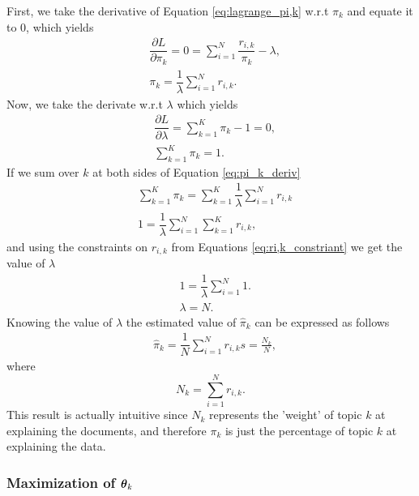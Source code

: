 \documentclass[12pt]{article}
\begin{document}
\noindent  First, we take the derivative of Equation \ref{eq:lagrange_pi,k} w.r.t $\pi_{k}$ and equate it to 0, which yields
\begin{align}\label{deriv_pi,k}
& \dfrac{\partial L}{\partial \pi_{k}} = 0 = \sum \limits_{i=1}^{N} \dfrac{r_{i,k}}{\pi_{k}} - \lambda, \\
& \pi_{k} = \dfrac{1}{\lambda} \sum \limits_{i=1}^{N} r_{i,k} \label{eq:pi_k_deriv}.
\end{align}
Now, we take the derivate w.r.t $\lambda$ which yields
\begin{align}
& \dfrac{\partial L}{\partial \lambda} = \sum \limits_{k=1}^{K} \pi_{k} - 1  = 0 ,\\
& \sum \limits_{k=1}^{K} \pi_{k} = 1.
\end{align}
If we sum over $k$ at both sides of Equation \ref{eq:pi_k_deriv}
\begin{align}
& \sum \limits_{k=1}^{K}\pi_{k} = \sum \limits_{k=1}^{K} \dfrac{1}{\lambda} \sum \limits_{i=1}^{N} r_{i,k}\\
& 1 = \dfrac{1}{\lambda} \sum \limits_{i=1}^{N}\sum \limits_{k=1}^{K}r_{i,k},
\end{align}
and using the constraints on $r_{i,k}$ from Equations \ref{eq:ri,k_constriant} we get the value of $\lambda$
\begin{align}
& 1 = \dfrac{1}{\lambda} \sum \limits_{i=1}^{N}1.\\
& \lambda = N.
\end{align}
Knowing the value of $\lambda$ the estimated value of $\hat{\pi}_{k}$ can be expressed as follows
\begin{align}\label{eq:pi_k}
& \hat{\pi}_{k} = \dfrac{1}{N} \sum \limits_{i=1}^{N} r_{i,k}s = \frac{N_k}{N},
\end{align}
where 
\begin{equation}\label{eq:N_k}
N_k = \sum_{i=1}^N r_{i,k}.
\end{equation}
This result is actually intuitive since $N_k$ represents the 'weight' of topic $k$ at explaining the documents, and therefore $\pi_k$ is just the percentage of topic $k$ at explaining the data.

\subsubsection{Maximization of $\boldsymbol\theta_k$}
\end{document}
